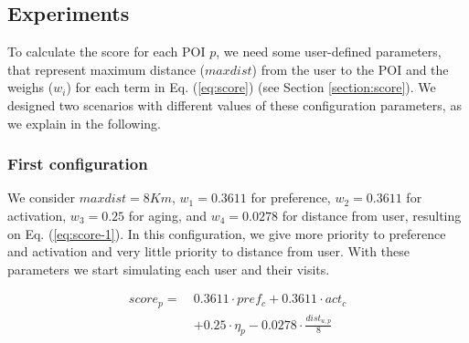\subsection{Experiments} \label{section:experiments}

To calculate the score for each POI $p$, we need some user-defined parameters, that represent maximum distance ($maxdist$) from the user to the POI and the weighs ($w_i$) for each term in Eq. (\ref{eq:score})   (see Section \ref{section:score}). We designed two scenarios with different values of these configuration parameters, as we explain in the following.

\subsubsection{First configuration} 
\label{section:experiment-1}
We consider $maxdist =8 Km$, $w_1 = 0.3611$ for preference, $w_2 = 0.3611$ for activation, $w_3 = 0.25$ for aging, and $w_4 = 0.0278$ for distance from user, resulting on 
Eq. (\ref{eq:score-1}). In this configuration, we give
more priority to preference and activation and very little priority to distance from user. With these parameters we start simulating each user and their visits.

\begin{equation} \label{eq:score-1}
    \begin{split}
        score_p = \ &0.3611 \cdot pref_c + 0.3611 \cdot act_c \\
                                        &+ 0.25 \cdot \eta_p - 0.0278 \cdot \frac{dist_{u,p}}{8}
    \end{split}
\end{equation}




